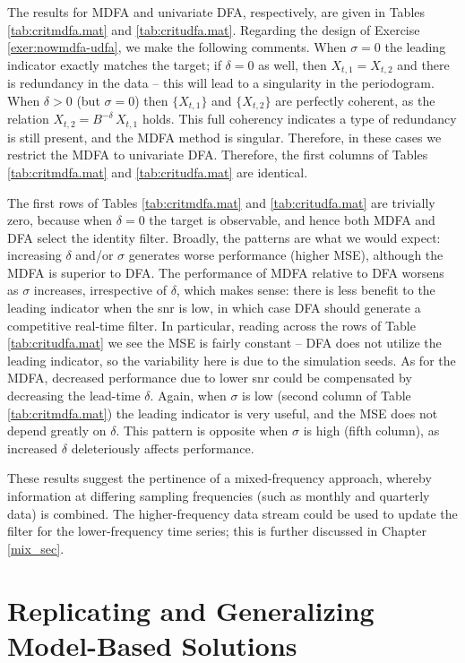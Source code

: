 \documentclass[a4paper]{book}
\begin{document}
 The results for MDFA and univariate DFA, respectively, are given in 
Tables \ref{tab:critmdfa.mat} and \ref{tab:critudfa.mat}.
Regarding the design of Exercise \ref{exer:nowmdfa-udfa}, we make the following 
comments.  When $\sigma = 0$ the leading indicator exactly matches the target;
 if $\delta = 0$ as well, then $X_{t,1} = X_{t,2}$ and there is redundancy in
 the data -- this will lead to a singularity in the periodogram.  When 
 $\delta > 0$ (but $\sigma = 0$) then $\{ X_{t,1} \}$ and $\{ X_{t,2} \}$
 are perfectly coherent, as the relation $X_{t,2} = B^{-\delta} \, X_{t,1}$ holds.
 This full coherency indicates a type of redundancy is still present,
 and the MDFA method is singular.  Therefore, in these cases we restrict
 the MDFA to univariate DFA.  Therefore, the first columns of 
 Tables \ref{tab:critmdfa.mat} and \ref{tab:critudfa.mat} are identical.

 The first rows of Tables \ref{tab:critmdfa.mat} and \ref{tab:critudfa.mat}
 are trivially zero, because when $\delta = 0$ the target is observable,
 and hence both MDFA and DFA select the identity filter.  
 Broadly, the patterns are what we would expect: increasing $\delta$ and/or
 $\sigma$ generates worse performance (higher MSE), although the MDFA is
 superior to DFA.  The performance of MDFA relative to DFA worsens as 
 $\sigma$ increases, irrespective of $\delta$, which makes sense: there
 is less benefit to the leading indicator when the snr is low, in which
 case DFA should generate a competitive real-time filter.
  In particular, reading across the rows of Table \ref{tab:critudfa.mat}
 we see the MSE is fairly constant -- DFA does not utilize the leading indicator,
 so the variability here is due to the simulation seeds.
  As for the MDFA, decreased performance due to lower snr could be 
 compensated by decreasing the lead-time $\delta$.  
  Again, when $\sigma$ is low (second column of Table \ref{tab:critmdfa.mat})
  the leading indicator is very useful, and the MSE does not depend 
 greatly on $\delta$.  This pattern is opposite when $\sigma$ is high 
 (fifth column), as increased $\delta$ deleteriously affects performance.

   
These results suggest the pertinence of a mixed-frequency approach,
 whereby information at differing sampling frequencies (such as monthly
 and quarterly data) is combined.  The higher-frequency data stream
 could be used to update the filter for the lower-frequency time series;
 this is further discussed in Chapter \ref{mix_sec}. 
 

\section{Replicating and Generalizing Model-Based Solutions}
\end{document}
